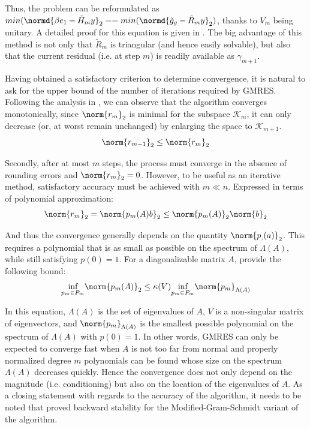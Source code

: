 \noindent Thus, the problem can be reformulated as $min(\normd{\beta e_1 -\tilde{H}_my}_2==min(\normd{\tilde{g}_g -\tilde{R}_my}_2)$, thanks to $V_m$ being unitary. A detailed proof for this equation is given in \cite{saad_iterative_2003}. The big advantage of this method is not only that $\tilde{R}_m$ is triangular (and hence easily solvable), but also that the current residual (i.e. at step $m$) is readily available as $\gamma_{m+1}$.

Having obtained a satisfactory criterion to determine convergence, it is natural to ask for the upper bound of the number of iterations required by GMRES. Following the analysis in \cite{trefethen_numerical_1997}, we can observe that the algorithm converges monotonically, since $\norm{r_m}_2$ is minimal for the subspace $\mathcal{K}_m$, it can only decrease (or, at worst remain unchanged) by enlarging the space to $\mathcal{K}_{m+1}$.
\begin{equation}
    \norm{r_{m-1}}_2\leq \norm{r_m}_2
\end{equation}

\noindent Secondly, after at most $m$ steps, the process must converge in the absence of rounding errors and $\norm{r_m}_2 = 0$. However, to be useful as an iterative method, satisfactory accuracy must be achieved with  $m \ll n$. Expressed in terms of polynomial approximation: 
\begin{equation}
    \norm{r_m}_2=\norm{p_m(A)b}_2 \leq \norm{p_m(A)}_2\norm{b}_2
\end{equation}

\noindent And thus the convergence generally depends on the quantity $\norm{p_,(a)}_2$. This requires a polynomial that is as small as possible on the spectrum of $\Lambda(A)$, while still satisfying $p(0)=1$. For a diagonalizable matrix $A$, \cite{trefethen_numerical_1997} provide the following bound:
\begin{equation}
    \underset{p_m \in P_m}{\text{inf}} \norm{p_m(A)}_2 \leq \kappa(V) \underset{p_m \in P_m}{\text{inf}} \norm{p_m}_{\Lambda(A)}
\end{equation}

\noindent In this equation, $\Lambda(A)$ is the set of eigenvalues of $A$, $V$ is a non-singular matrix of eigenvectors, and $\norm{p_m}_{\Lambda(A)}$ is the smallest possible polynomial on the spectrum of $\Lambda(A)$ with $p(0)=1$. In other words, GMRES can only be expected to converge fast when $A$ is not too far from normal and properly normalized degree $m$ polynomials can be found whose size on the spectrum $\Lambda(A)$ decreases quickly. Hence the convergence does not only depend on the magnitude (i.e. conditioning) but also on the location of the eigenvalues of $A$.
As a closing statement with regards to the accuracy of the algorithm, it needs to be noted that \cite{paige_modified_2006} proved backward stability for the Modified-Gram-Schmidt variant of the algorithm. 